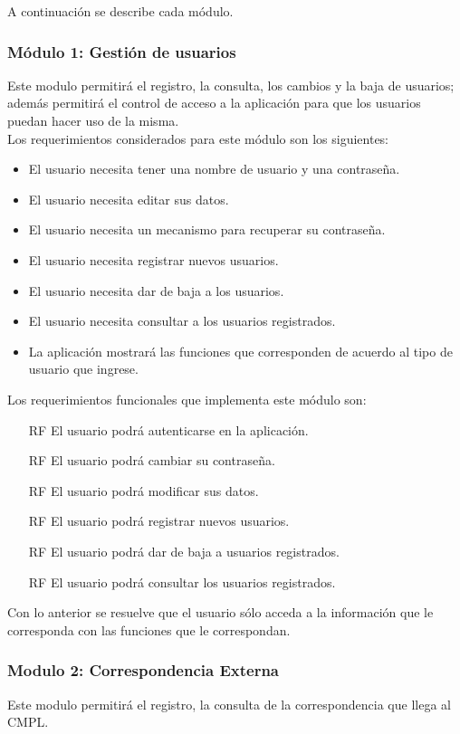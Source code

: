 A continuación se describe cada módulo.

\subsubsection{Módulo 1: Gestión de usuarios}
Este modulo permitirá el registro, la consulta, los cambios y la baja de usuarios; además permitirá el control de acceso a la aplicación para que los usuarios puedan hacer uso de la misma. \\
 
Los requerimientos considerados para este módulo son los siguientes:
\begin{itemize}
	\item El usuario necesita tener una nombre de usuario y una contraseña.
	\item El usuario necesita editar sus datos.
	\item El usuario necesita un mecanismo para recuperar su contraseña.
	\item El usuario necesita registrar nuevos usuarios.
	\item El usuario necesita dar de baja a los usuarios.
	\item El usuario necesita consultar a los usuarios registrados.
	\item La aplicación mostrará las funciones que corresponden de acuerdo al tipo de usuario que ingrese.
\end{itemize} 

Los requerimientos funcionales que implementa este módulo son:
\begin{itemize}
	\item[RF] El usuario podrá autenticarse en la aplicación.
	\item[RF] El usuario podrá cambiar su contraseña.
	\item[RF] El usuario podrá modificar sus datos.
	\item[RF] El usuario podrá registrar nuevos usuarios.
	\item[RF] El usuario podrá dar de baja a usuarios registrados.
	\item[RF] El usuario podrá consultar los usuarios registrados.
\end{itemize}

Con lo anterior se resuelve que el usuario sólo acceda a la información que le corresponda con las funciones que le correspondan.

\subsubsection{Modulo 2: Correspondencia Externa}
Este modulo permitirá el registro, la consulta de la correspondencia que llega al CMPL. \\


